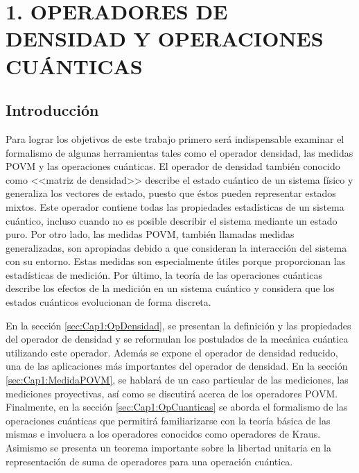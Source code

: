 \chapter[OPERADORES DE DENSIDAD Y OPERACIONES CUÁNTICAS]{1. OPERADORES DE DENSIDAD Y OPERACIONES CUÁNTICAS}
\section{Introducción}\label{cap:IntroduccionMarcoteorico} %

Para lograr los objetivos de este trabajo   
primero será indispensable examinar el formalismo de
algunas herramientas tales como el operador densidad, las medidas POVM y las
operaciones cuánticas. El operador de densidad también conocido como <<matriz
de densidad>> describe el estado cuántico de un sistema físico y generaliza los
vectores de estado, puesto que éstos pueden representar estados mixtos. Este
operador contiene todas las propiedades estadísticas de un sistema cuántico,
incluso cuando no es posible describir el sistema mediante un estado puro. Por
otro lado, las medidas POVM, también llamadas medidas generalizadas, son apropiadas debido a que consideran la interacción del sistema con su entorno. Estas medidas son especialmente útiles
porque proporcionan las estadísticas de medición. Por último, la teoría
de las operaciones cuánticas describe los efectos de la medición en un sistema
cuántico y considera que los estados cuánticos evolucionan de forma discreta.  


En la sección {\ref{sec:Cap1:OpDensidad}}, se presentan la definición y las propiedades del
operador de densidad y se reformulan los postulados de la mecánica cuántica
utilizando este operador. Además se expone el operador de densidad reducido,
una de las aplicaciones más importantes del operador de densidad. En la sección {\ref{sec:Cap1:MedidaPOVM}}, se hablará de un caso particular de las mediciones, las mediciones proyectivas, así como se discutirá acerca de los operadores POVM\@. Finalmente, en la sección {\ref{sec:Cap1:OpCuanticas}} se aborda el formalismo de las operaciones cuánticas que permitirá familiarizarse con la teoría básica de las mismas e involucra a los operadores conocidos como operadores de Kraus. Asimismo se presenta un teorema importante sobre la libertad unitaria en la representación de suma de
operadores para una operación cuántica.
